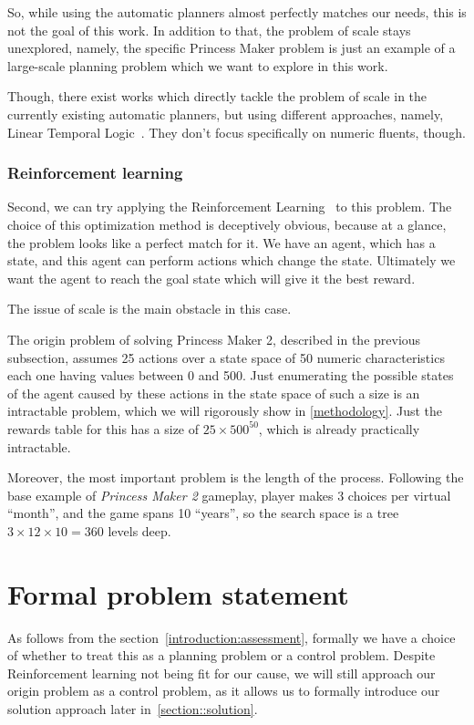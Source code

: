 \documentclass[12pt, a4paper]{article}
\begin{document}
	So, while using the automatic planners almost perfectly matches our needs, this is not the goal of this work.
	In addition to that, the problem of scale stays unexplored, namely, the specific Princess Maker problem is just an example of a large-scale planning problem which we want to explore in this work.
	
	Though, there exist works which directly tackle the problem of scale in the currently existing automatic planners, but using different approaches, namely, Linear Temporal Logic~\cite{LU2025121666}.
	They don't focus specifically on numeric fluents, though.

  \subsubsection{Reinforcement learning}
	Second, we can try applying the Reinforcement Learning~\cite{sutton2018reinforcement} to this problem.
	The choice of this optimization method is deceptively obvious, because at a glance, the problem looks like a perfect match for it.
	We have an agent, which has a state, and this agent can perform actions which change the state.
	Ultimately we want the agent to reach the goal state which will give it the best reward.
	
	The issue of scale is the main obstacle in this case.

	The origin problem of solving Princess Maker 2, described in the previous subsection,  assumes 25 actions over a state space of 50 numeric characteristics each one having values between 0 and 500.
	Just enumerating the possible states of the agent caused by these actions in the state space of such a size is an intractable problem, which we will rigorously show in \ref{methodology}.
	Just the rewards table for this has a size of $25 \times 500^{50}$, which is already practically intractable.
	
	Moreover, the most important problem is the length of the process.
	Following the base example of \textit{Princess Maker 2} gameplay, player makes 3 choices per virtual ``month'', and the game spans 10 ``years'', so the search space is a tree $3 \times 12 \times 10 = 360$ levels deep.
	
	\section{Formal problem statement}\label{problem-statement}

	As follows from the section~\ref{introduction:assessment}, formally we have a choice of whether to treat this as a planning problem or a control problem.
	Despite Reinforcement learning not being fit for our cause, we will still approach our origin problem as a control problem, as it allows us to formally introduce our solution approach later in~\ref{section::solution}.
\end{document}
